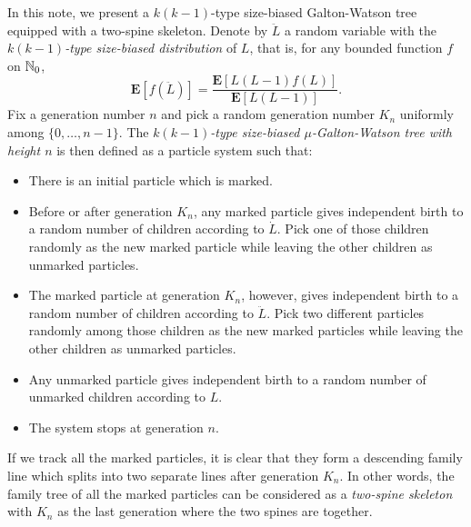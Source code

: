 \documentclass[12pt]{amsart}
\numberwithin{equation}{section}
\newcommand{\defn}[1]{{\em #1}}
\newcommand{\expr}[1]{\left( #1 \right)}
\newcommand{\brac}[1]{\left[ #1 \right]}
\newcommand{\expct}{\mathbf E}
\begin{document}
\par
	In this note, we present a $k(k-1)$-type size-biased Galton-Watson tree equipped with a two-spine skeleton. 
	Denote by $\ddot L$ a random variable with the \defn{$k(k-1)$-type size-biased distribution} of $L$, that is, for any 
	bounded function $f$ on $\mathbb N_0$,
\begin{equation*}
		\expct\brac{f\expr{\ddot L}}
	=
		\frac{\expct\brac{L(L-1)f(L)}}{\expct\brac{L(L-1)}}.
\end{equation*}
	Fix a generation number $n$ and pick a random generation number $K_n$ uniformly among 
	$\{0,\dots,n-1\}$.
	The \defn{$k(k-1)$-type size-biased $\mu$-Galton-Watson tree with height $n$} is then defined as a particle system such that:
\begin{itemize}
\item
	There is an initial particle which is marked.
\item
	Before or after generation $K_n$, any marked particle gives independent birth to a random number of children according to $\dot L$. 
	Pick one of those children randomly as the new marked particle while leaving the other children as unmarked particles.
\item
	The marked particle at generation $K_n$, however, gives independent birth to a random number of children according to $\ddot L$. 
	Pick two different particles randomly among those children as the new marked particles while leaving the other children as unmarked particles.
\item
	Any unmarked particle gives independent birth to a random number of unmarked children according to $L$.
\item
	The system stops at generation $n$.
\end{itemize}
\par
	If we track all the marked particles, it is clear that they form a descending family line which splits into two separate lines after generation $K_n$. 
	In other words, the family tree of all the marked particles can be considered as a \defn{two-spine skeleton} with $K_n$ as the last generation where the two spines are together.
\par	
\end{document}
